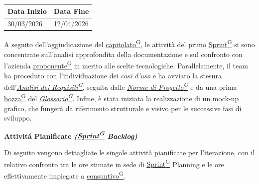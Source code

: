 \documentclass[a4paper,12pt]{article}
\newcounter{subsubsubsection}[subsubsection]
\providecommand{\glslink}[2]{\href{https://alittlebyte-19.github.io/Documentazione/glossario.html\#gls-#1}{\underline{#2}\textsuperscript{\scriptsize G}}}
\begin{document}

\label{sec:rtb_primoperiodo}
\begin{table}[H]
    \centering
    \renewcommand{\arraystretch}{1.5} %
    \begin{tabularx}{\textwidth}{|X|X|}
    \hline \rowcolor{Dandelion!50}
    \textbf{Data Inizio} & \textbf{Data Fine}\\
    \hline
    30/03/2026 & 12/04/2026\\
    \hline

    \end{tabularx}
\end{table}


A seguito dell'aggiudicazione del \glslink{capitolato}{capitolato}, le attività del primo \glslink{sprint}{Sprint} si sono concentrate sull'analisi approfondita della documentazione e sul confronto con l'azienda \glslink{committente-proponente}{proponente} in merito alle scelte tecnologiche. Parallelamente, il team ha proceduto con l'individuazione dei \textit{casi d'uso} e ha avviato la stesura dell'\textit{\glslink{analisi-dei-requisiti-adr}{Analisi dei Requisiti}}, seguita dalle \textit{\glslink{norme-di-progetto}{Norme di Progetto}} e da una prima \glslink{bozza-draft}{bozza} del \textit{\glslink{glossario}{Glossario}}. Infine, è stata iniziata la realizzazione di un mock-up grafico, che fungerà da riferimento strutturale e visivo per le successive fasi di sviluppo.

\begin{center}
\noindent\textbf{Attivitá Pianificate \textit{(\glslink{sprint}{Sprint} Backlog)}}\\
\end{center}
Di seguito vengono dettagliate le singole attività pianificate per l'iterazione, con il relativo confronto tra le ore stimate in sede di \glslink{sprint}{Sprint} Planning e le ore effettivamente impiegate a \glslink{consuntivo}{consuntivo}.
\end{document}
